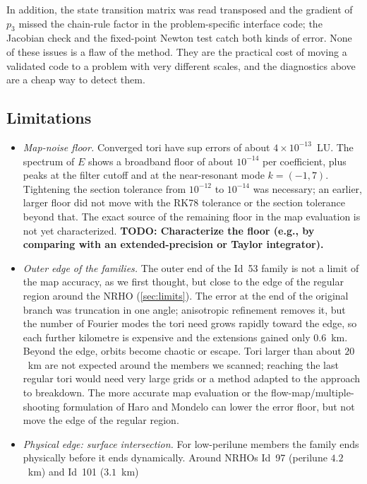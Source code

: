 \documentclass[11pt]{article}
\newcommand{\todo}[1]{\textbf{TODO: #1}}
\begin{document}
In addition, the state transition matrix was read transposed and the gradient of $p_3$ missed the
chain-rule factor in the problem-specific interface code; the Jacobian check and the fixed-point
Newton test catch both kinds of error. None of these issues is a flaw of the method. They are the
practical cost of moving a validated code to a problem with very different scales, and the
diagnostics above are a cheap way to detect them.

\subsection{Limitations}\label{sec:limitations}
\begin{itemize}
\item \emph{Map-noise floor.} Converged tori have sup errors of about $4\times10^{-13}$~LU. The
  spectrum of $E$ shows a broadband floor of about $10^{-14}$ per coefficient, plus peaks at the
  filter cutoff and at the near-resonant mode $k=(-1,7)$. Tightening the section tolerance from
  $10^{-12}$ to $10^{-14}$ was necessary; an earlier, larger floor did not move with the RK78
  tolerance or the section tolerance beyond that. The exact source of the remaining floor in the
  map evaluation is not yet characterized. \todo{Characterize the floor (e.g., by comparing with an
  extended-precision or Taylor integrator).}
\item \emph{Outer edge of the families.} The outer end of the Id~53 family is not a limit of
  the map accuracy, as we first thought, but close to the edge of the regular region around the
  NRHO (\cref{sec:limits}). The error at the end of the original branch was truncation in one
  angle; anisotropic refinement removes it, but the number of Fourier modes the tori need grows
  rapidly toward the edge, so each further kilometre is expensive and the extensions gained only
  $0.6$~km. Beyond the edge, orbits become chaotic or escape. Tori larger than about $20$~km are
  not expected around the members we scanned; reaching the last regular tori would need very
  large grids or a method adapted to the approach to breakdown. The more accurate map evaluation or
  the flow-map/multiple-shooting formulation of Haro and Mondelo \cite{haromondelo2021flow} can
  lower the error floor, but not move the edge of the regular region.
\item \emph{Physical edge: surface intersection.} For low-perilune members the family ends
  physically before it ends dynamically. Around NRHOs Id~97 (perilune $4.2$~km) and Id~101 ($3.1$~km)

\end{itemize}
\end{document}
